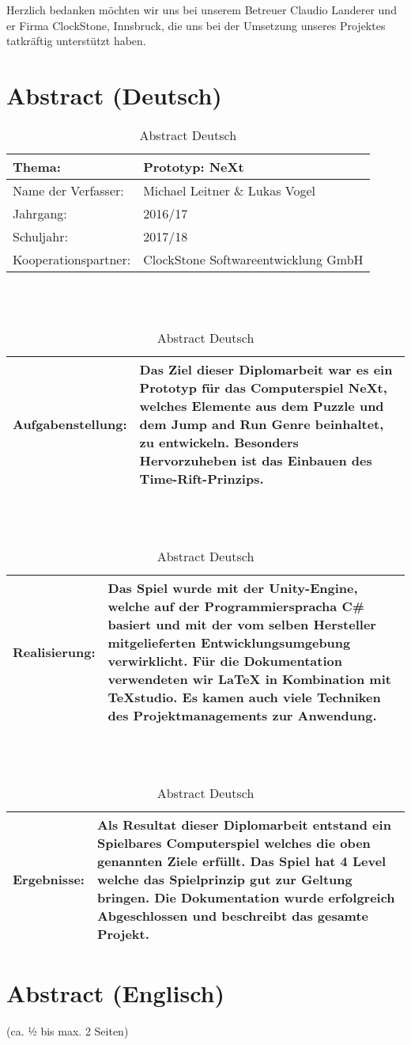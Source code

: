Herzlich bedanken möchten wir uns bei unserem Betreuer Claudio Landerer und er Firma ClockStone, Innsbruck, die uns bei der Umsetzung unseres Projektes tatkräftig unterstützt haben. 


\chapter*{Abstract (Deutsch)}
\def \currentAuthor {Lukas Vogel}
\begin{table}[H]
	\caption{Abstract Deutsch}
	\renewcommand{\arraystretch}{1.5}
\begin{tabular}{|p{4cm}|p{10cm}|}
	\hline 
	Thema: &  Prototyp: NeXt\\ 
	\hline
	 Name der Verfasser: & Michael Leitner \& Lukas Vogel  \\ 
	\hline 
	Jahrgang: & 2016/17 \\
	\hline
	 Schuljahr: & 2017/18 \\
	\hline 
	Kooperationspartner: & ClockStone Softwareentwicklung GmbH\\
	\hline
\end{tabular}
\ \\
\ \\
\begin{tabular}{|p{4cm}|p{10cm}|}
	\hline
	Aufgabenstellung: & Das Ziel dieser Diplomarbeit war es ein Prototyp für das Computerspiel NeXt, welches Elemente aus dem Puzzle und dem Jump and Run Genre beinhaltet, zu entwickeln. Besonders Hervorzuheben ist das Einbauen des Time-Rift-Prinzips.   \\
	\hline
\end{tabular} 
\ \\
\ \\
\begin{tabular}{|p{4cm}|p{10cm}|}
	\hline
	Realisierung: & Das Spiel wurde mit der Unity-Engine, welche auf der Programmierspracha C\# basiert und mit der vom selben Hersteller mitgelieferten Entwicklungsumgebung verwirklicht. Für die Dokumentation verwendeten wir LaTeX in Kombination mit TeXstudio. Es kamen auch viele Techniken des Projektmanagements zur Anwendung.\\
	\hline
\end{tabular}
\ \\
\ \\
\begin{tabular}{|p{4cm}|p{10cm}|}
	\hline
	Ergebnisse: & Als Resultat dieser Diplomarbeit entstand ein Spielbares Computerspiel welches die oben genannten Ziele erfüllt. Das Spiel hat 4 Level welche das Spielprinzip gut zur Geltung bringen. Die Dokumentation wurde erfolgreich Abgeschlossen und beschreibt das gesamte Projekt. \\
	\hline
\end{tabular}
\end{table}
\chapter*{Abstract (Englisch)}
(ca. ½ bis max. 2 Seiten)